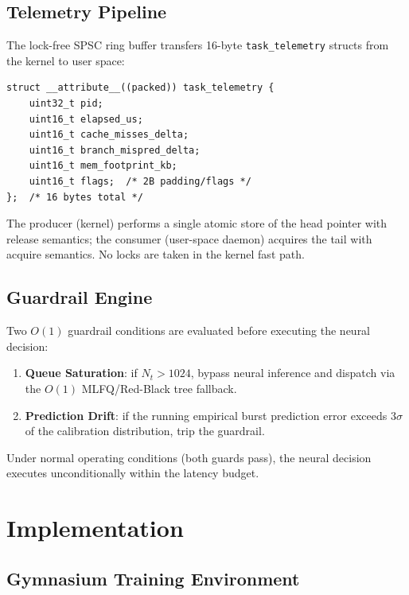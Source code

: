 \subsection{Telemetry Pipeline}
\label{subsec:telemetry}

The lock-free SPSC ring buffer transfers 16-byte \texttt{task\_telemetry}
structs from the kernel to user space:
\begin{footnotesize}
\begin{verbatim}
struct __attribute__((packed)) task_telemetry {
    uint32_t pid;
    uint16_t elapsed_us;
    uint16_t cache_misses_delta;
    uint16_t branch_mispred_delta;
    uint16_t mem_footprint_kb;
    uint16_t flags;  /* 2B padding/flags */
};  /* 16 bytes total */
\end{verbatim}
\end{footnotesize}
The producer (kernel) performs a single atomic store of the head pointer with
release semantics; the consumer (user-space daemon) acquires the tail with
acquire semantics. No locks are taken in the kernel fast path.

\subsection{Guardrail Engine}
\label{subsec:guardrails}

Two $O(1)$ guardrail conditions are evaluated before executing the neural decision:

\begin{enumerate}
  \item \textbf{Queue Saturation}: if $N_t > 1024$, bypass neural inference and
    dispatch via the $O(1)$ MLFQ/Red-Black tree fallback.
  \item \textbf{Prediction Drift}: if the running empirical burst prediction
    error exceeds $3\sigma$ of the calibration distribution, trip the guardrail.
\end{enumerate}

Under normal operating conditions (both guards pass), the neural decision
executes unconditionally within the latency budget.

\section{Implementation}
\label{sec:impl}

\subsection{Gymnasium Training Environment}
\label{subsec:gym}

